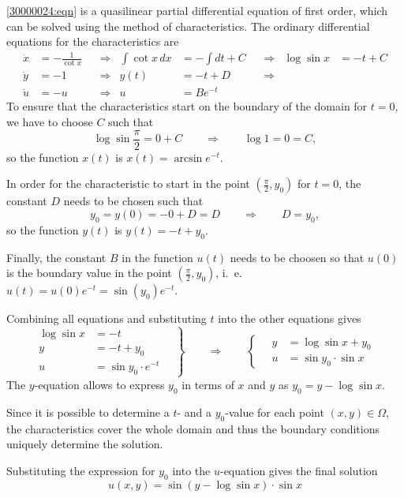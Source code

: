 \begin{loesung}
\eqref{30000024:eqn} is a quasilinear partial differential equation of
first order, which can be solved using the method of characteristics.
The ordinary differential equations for the characteristics are
\[
\begin{aligned}
\dot{x} &= -\frac1{\cot x}
&&\Rightarrow&
\int \cot x\,dx &= -\int dt + C
&&\Rightarrow&
\log\sin x&= -t+C
\\
\dot{y}&=-1
&&\Rightarrow&
y(t) &= -t + D
&&\Rightarrow&
\\
\dot{u}&=-u
&&\Rightarrow&
u&=Be^{-t}
\end{aligned}
\]
To ensure that the characteristics start on the boundary of the domain
for $t=0$, we have to choose $C$ such that 
\[
\log\sin \frac{\pi}{2} = 0+C
\qquad\Rightarrow\qquad
\log 1 = 0 = C,
\]
so the function $x(t)$ is $x(t)=\arcsin e^{-t}$.

In order for the characteristic to start in the point $(\frac{\pi}2,y_0)$ 
for $t=0$, the constant $D$ needs to be chosen such that 
\[
y_0
=
y(0) = -0 + D = D
\qquad\Rightarrow\qquad
D=y_0,
\]
so the function
$y(t)$ is $y(t) = -t+y_0$.

Finally, the constant $B$ in the function $u(t)$ needs to be choosen so
that $u(0)$ is the boundary value in the point $(\frac{\pi}2,y_0)$,
i.~e.~$u(t)=u(0)e^{-t} = \sin(y_0)e^{-t}$.

Combining all equations and substituting $t$ into the other equations
gives
\[
\left.
\begin{aligned}
\log\sin x &= -t
\\
y &= -t + y_0
\\
u &= \sin y_0\cdot e^{-t}
\end{aligned}
\quad
\right\}
\qquad
\Rightarrow
\qquad
\left\{
\quad
\begin{aligned}
y&=\log\sin x+y_0
\\
u&=\sin y_0\cdot \sin x
\end{aligned}
\right.
\]
The $y$-equation allows to express $y_0$ in terms of $x$ and $y$ as
\(y_0=y-\log\sin x\).

\begin{teilaufgaben}
\item
Since it is possible to determine a $t$- and a $y_0$-value for each
point $(x,y)\in \Omega$, the characteristics cover the whole domain
and thus the boundary conditions uniquely determine the solution.
\item
Substituting the expression for $y_0$ into the $u$-equation gives
the final solution
\begin{equation}
u(x,y)=\sin(y-\log\sin x)\cdot \sin x
\label{30000024:solution}
\end{equation}


\end{teilaufgaben}
\end{loesung}
